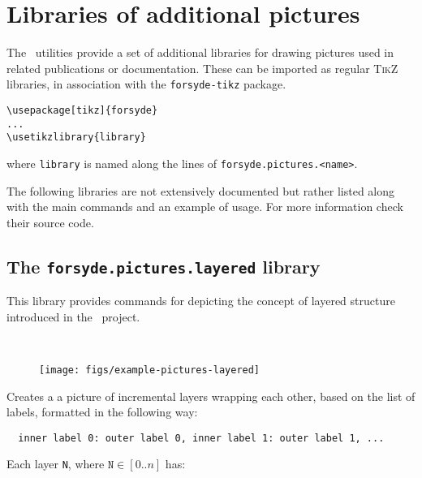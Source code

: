 \section{Libraries of additional pictures}
\label{sec:forsyde-pictures}

The \ForSyDeLaTeX\ utilities provide a set of additional libraries for drawing pictures used in related publications or documentation. These can be imported as regular \textsc{TikZ} libraries, in association with the \texttt{forsyde-tikz} package.
%
\begin{verbatim}
\usepackage[tikz]{forsyde}
...
\usetikzlibrary{library}
\end{verbatim}
%
\noindent where \texttt{library} is named along the lines of \texttt{forsyde.pictures.<name>}.

The following libraries are not extensively documented but rather listed along with the main commands and an example of usage. For more information check their source code.

\subsection{The \texttt{forsyde.pictures.layered} library}
\label{sec:forsyde-pictures-layered}

This library provides commands for depicting the concept of layered structure introduced in the \ForSyDeAtom\ project.

\begin{figure}[h]\hspace{-2ex}
  \centering
  \begin{minipage}{.68\linewidth}
  
\end{minipage}
~
\begin{minipage}{.3\linewidth}
  \texttt{[image: figs/example-pictures-layered]}  
\end{minipage}
\end{figure}

\hspace{1pt}

\noindent Creates a a picture of incremental layers wrapping each other, based on the list of labels, formatted in the following way:
%
\begin{verbatim}
  inner label 0: outer label 0, inner label 1: outer label 1, ...
\end{verbatim}
%
Each layer \texttt{N}, where $\mathtt{N} \in [0..n]$ has:

